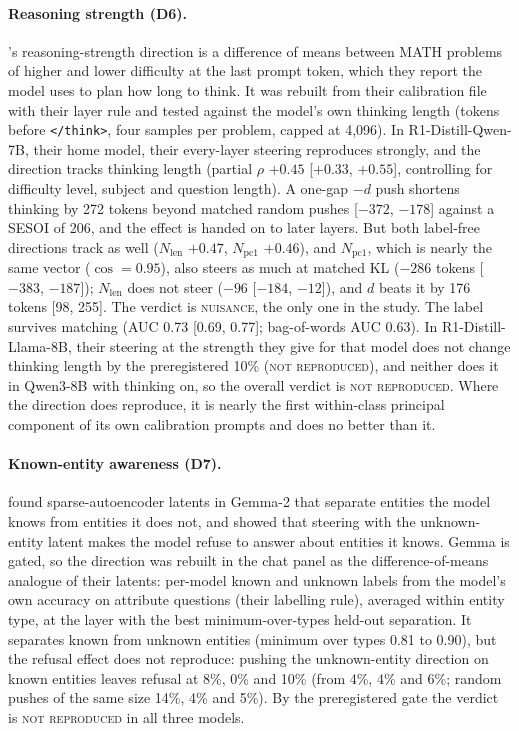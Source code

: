 \documentclass[11pt]{article}
\newcommand{\verdict}[1]{\textsc{\MakeLowercase{#1}}}
\begin{document}
\paragraph{Reasoning strength (D6).} \citet{sheng2025strength}'s reasoning-strength direction is a difference of means between MATH \citep{hendrycks2021math} problems of higher and lower difficulty at the last prompt token, which they report the model uses to plan how long to think. It was rebuilt from their calibration file with their layer rule and tested against the model's own thinking length (tokens before \texttt{</think>}, four samples per problem, capped at 4,096). In R1-Distill-Qwen-7B, their home model, their every-layer steering reproduces strongly, and the direction tracks thinking length (partial $\rho$ $+0.45$ [$+0.33$, $+0.55$], controlling for difficulty level, subject and question length). A one-gap $-d$ push shortens thinking by 272 tokens beyond matched random pushes [$-372$, $-178$] against a SESOI of 206, and the effect is handed on to later layers. But both label-free directions track as well ($N_\text{len}$ $+0.47$, $N_\text{pc1}$ $+0.46$), and $N_\text{pc1}$, which is nearly the same vector ($\cos = 0.95$), also steers as much at matched KL ($-286$ tokens [$-383$, $-187$]); $N_\text{len}$ does not steer ($-96$ [$-184$, $-12$]), and $d$ beats it by 176 tokens [98, 255]. The verdict is \verdict{NUISANCE}, the only one in the study. The label survives matching (AUC 0.73 [0.69, 0.77]; bag-of-words AUC 0.63). In R1-Distill-Llama-8B, their steering at the strength they give for that model does not change thinking length by the preregistered 10\% (\verdict{NOT REPRODUCED}), and neither does it in Qwen3-8B with thinking on, so the overall verdict is \verdict{NOT REPRODUCED}. Where the direction does reproduce, it is nearly the first within-class principal component of its own calibration prompts and does no better than it.

\paragraph{Known-entity awareness (D7).} \citet{ferrando2025entities} found sparse-autoencoder latents in Gemma-2 that separate entities the model knows from entities it does not, and showed that steering with the unknown-entity latent makes the model refuse to answer about entities it knows. Gemma is gated, so the direction was rebuilt in the chat panel as the difference-of-means analogue of their latents: per-model known and unknown labels from the model's own accuracy on attribute questions (their labelling rule), averaged within entity type, at the layer with the best minimum-over-types held-out separation. It separates known from unknown entities (minimum over types 0.81 to 0.90), but the refusal effect does not reproduce: pushing the unknown-entity direction on known entities leaves refusal at 8\%, 0\% and 10\% (from 4\%, 4\% and 6\%; random pushes of the same size 14\%, 4\% and 5\%). By the preregistered gate the verdict is \verdict{NOT REPRODUCED} in all three models.
\end{document}

